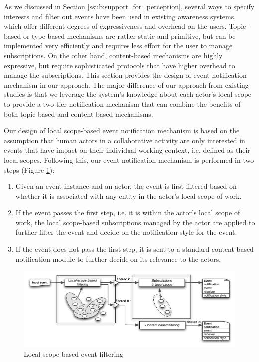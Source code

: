 As we discussed in Section \ref{ssub:support_for_perception}, several ways to specify interests and filter out events have been used in existing awareness systems, which offer different degrees of expressiveness and overhead on the users. Topic-based or type-based mechanisms are rather static and primitive, but can be implemented very efficiently and requires less effort for the user to manage subscriptions. On the other hand, content-based mechanisms are highly expressive, but require sophisticated protocols that have higher overhead to manage the subscriptions. This section provides the design of event notification mechanism in our approach. The major difference of our approach from existing studies is that we leverage the system's knowledge about each actor's local scope to provide a two-tier notification mechanism that can combine the benefits of both topic-based and content-based mechanisms. 

Our design of local scope-based event notification mechanism is based on the assumption that human actors in a collaborative activity are only interested in events that have impact on their individual working context, i.e. defined as their local scopes. Following this, our event notification mechanism is performed in two steps (Figure \ref{fig:event_filtering}):
\begin{enumerate}
  	\item Given an event instance and an actor, the event is first filtered based on whether it is associated with any entity in the actor's local scope of work. 
  	\item If the event passes the first step, i.e. it is within the actor's local scope of work, the local scope-based subscriptions managed by the actor are applied to further filter the event and decide on the notification style for the event.
  	\item If the event does not pass the first step, it is sent to a standard content-based notification module to further decide on its relevance to the actors.
\end{enumerate}  

\begin{figure}[htbp] %
	\centering
	\includegraphics{event_filtering.pdf} 
	\caption{Local scope-based event filtering}
	\label{fig:event_filtering}
\end{figure}


